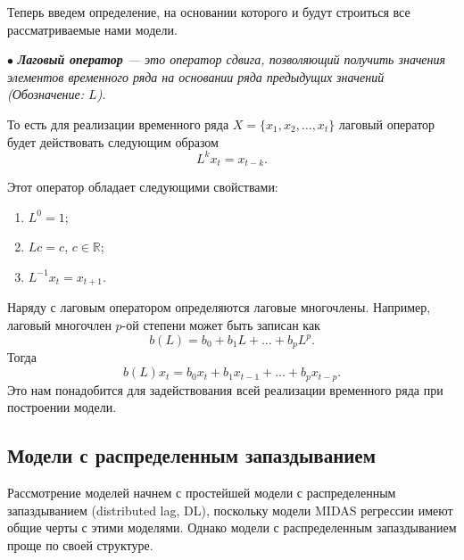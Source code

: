 \documentclass[a4paper, 12pt]{extarticle}
\numberwithin{equation}{subsection}
\newcommand{\Rm}{\mathbb{R}}
\begin{document}
	Теперь введем определение, на основании которого и будут строиться все рассматриваемые нами модели.
	
	$\bullet$ \textit{\textbf{Лаговый оператор} --- это оператор сдвига, позволяющий получить значения элементов временного ряда на основании ряда предыдущих значений (Обозначение: $L$).}
	
	То есть для реализации временного ряда $X = \{x_1, x_2,\ldots, x_t\}$ лаговый оператор будет действовать следующим образом 
	\begin{equation}
		L^k x_t = x_{t-k}.
	\end{equation}
	
	Этот оператор обладает следующими свойствами:
	\begin{enumerate}
		\item $L^0 = 1$;
		\item $Lc = c$, $c \in \Rm$;
		\item $L^{-1} x_t = x_{t+1}$.
	\end{enumerate}
	
	Наряду с лаговым оператором определяются лаговые многочлены. Например, лаговый многочлен $p$-ой степени может быть записан как
	\begin{equation}
		b(L) = b_0 + b_1 L + \ldots + b_pL^p.
	\end{equation}
	Тогда 
	\begin{equation}
		b(L)x_t = b_0 x_t + b_1 x_{t-1} + \ldots + b_p x_{t-p}.
	\end{equation}
	Это нам понадобится для задействования всей реализации временного ряда при построении модели.
	\subsection{Модели с распределенным запаздыванием}
	Рассмотрение моделей начнем с простейшей модели с распределенным запаздыванием (distributed lag, DL), поскольку модели MIDAS регрессии имеют общие черты с этими моделями. Однако модели с распределенным запаздыванием проще по своей структуре. 
	
\end{document}
